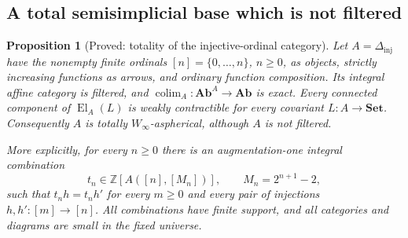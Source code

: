\documentclass[11pt,a4paper]{article}
\newtheorem{proposition}[theorem]{Proposition}
\theoremstyle{definition}
\theoremstyle{remark}
\newcommand{\Set}{\mathbf{Set}}
\newcommand{\Ab}{\mathbf{Ab}}
\newcommand{\Z}{\mathbb Z}
\newcommand{\Winfty}{W_\infty}
\newcommand{\El}{\operatorname{El}}
\newcommand{\colim}{\operatorname*{colim}}
\begin{document}


\subsection{A total semisimplicial base which is not filtered}

\begin{proposition}[Proved: totality of the injective-ordinal category]
\label{A:semisimplicial-total}
Let $A=\Delta_{\mathrm{inj}}$ have the nonempty finite ordinals
$[n]=\{0,\ldots,n\}$, $n\geq0$, as objects, strictly increasing
functions as arrows, and ordinary function composition.  Its integral
affine category is filtered, and
$\colim_A:\Ab^A\to\Ab$ is exact.  Every connected component of
$\El_A(L)$ is weakly contractible for every covariant
$L:A\to\Set$.  Consequently $A$ is totally $\Winfty$-aspherical,
although $A$ is not filtered.

More explicitly, for every $n\geq0$ there is an augmentation-one
integral combination
\[
 t_n\in\Z[A([n],[M_n])],\qquad M_n=2^{n+1}-2,
\]
such that $t_nh=t_nh'$ for every $m\geq0$ and every pair of
injections $h,h':[m]\to[n]$.  All combinations have finite support,
and all categories and diagrams are small in the fixed universe.
\end{proposition}
\end{document}
